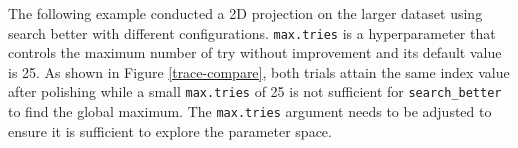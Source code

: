 \documentclass[12pt]{article}
\newenvironment{Shaded}{\begin{snugshade}}{\end{snugshade}}
\newcommand{\DataTypeTok}[1]{\textcolor[rgb]{0.13,0.29,0.53}{#1}}
\newcommand{\DecValTok}[1]{\textcolor[rgb]{0.00,0.00,0.81}{#1}}
\newcommand{\KeywordTok}[1]{\textcolor[rgb]{0.13,0.29,0.53}{\textbf{#1}}}
\newcommand{\NormalTok}[1]{#1}
\newcommand{\OperatorTok}[1]{\textcolor[rgb]{0.81,0.36,0.00}{\textbf{#1}}}
\newcommand{\OtherTok}[1]{\textcolor[rgb]{0.56,0.35,0.01}{#1}}
\newcommand{\StringTok}[1]{\textcolor[rgb]{0.31,0.60,0.02}{#1}}
\begin{document}
\begin{Shaded}
\end{Shaded}

The following example conducted a 2D projection on the larger dataset
using search better with different configurations. \texttt{max.tries} is
a hyperparameter that controls the maximum number of try without
improvement and its default value is 25. As shown in Figure
\ref{trace-compare}, both trials attain the same index value after
polishing while a small \texttt{max.tries} of 25 is not sufficient for
\texttt{search\_better} to find the global maximum. The
\texttt{max.tries} argument needs to be adjusted to ensure it is
sufficient to explore the parameter space.
\end{document}
